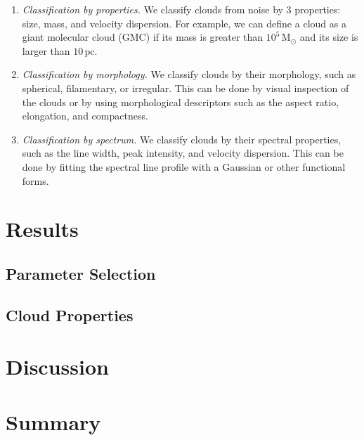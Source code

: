 \documentclass[twocolumn,trackchanges]{aastex701}
\begin{document}
\begin{enumerate}
    \item \textit{Classification by properties.} We classify clouds from noise by 3 properties: size, mass, and velocity dispersion. For example, we can define a cloud as a giant molecular cloud (GMC) if its mass is greater than $10^5\,\mathrm{M_\odot}$ and its size is larger than $10\,\mathrm{pc}$.
    \item \textit{Classification by morphology.} We classify clouds by their morphology, such as spherical, filamentary, or irregular. This can be done by visual inspection of the clouds or by using morphological descriptors such as the aspect ratio, elongation, and compactness.
    \item \textit{Classification by spectrum.} We classify clouds by their spectral properties, such as the line width, peak intensity, and velocity dispersion. This can be done by fitting the spectral line profile with a Gaussian or other functional forms.
\end{enumerate}

\section{Results}



\subsection{Parameter Selection}

\subsection{Cloud Properties}

\section{Discussion}

\section{Summary}



\end{document}
